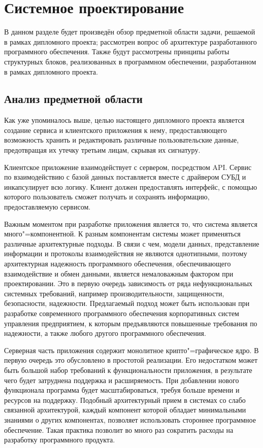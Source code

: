 \section{Системное проектирование}
\label{sec:domain}

В данном разделе будет произведён обзор предметной области задачи, решаемой в рамках дипломного проекта; рассмотрен вопрос об архитектуре разработанного программного обеспечения.
Также будут рассмотрены принципы работы структурных блоков, реализованных в программном обеспечении, разработанном в рамках дипломного проекта.

\subsection{Анализ предметной области}
\label{sub:domain:bayes_net}

Как уже упоминалось выше, целью настоящего дипломного проекта является создание сервиса и клиентского приложения к нему, предоставляющего возможность хранить и редактировать различные пользовательские данные, предотвращая их утечку третьим лицам, скрывая их сигнатуру.

Клиентское приложение взаимодействует с сервером, посредством API. Сервис по взаимодействию с базой данных поставляется вместе с драйвером СУБД и инкапсулирует всю логику. Клиент должен предоставлять интерфейс, с помощью которого пользователь сможет получать и сохранять информацию, предоставляемую сервисом.

Важным моментом при разработке приложения является то, что система является много"=компонентной. К разным компонентам системы может применяться различные архитектурные подходы. В связи с чем, модели данных, представление информации и протоколы взаимодействия не являются однотипными, поэтому архитектурная надежность программного обеспечения, обеспечивающего взаимодействие и обмен данными, является немаловажным фактором при проектировании. Это в первую очередь зависимость от ряда нефункциональных системных требований, например производительности, защищенности, безопасности, надежности.
Предлагаемый подход может быть использован при разработке современного программного обеспечения корпоративных систем управления предприятием, к которым предъявляются повышенные требования по надежности, а также любого другого программного обеспечения.

Серверная часть приложения содержит монолитное крипто"=графическое ядро. В первую очередь это обусловлено в простотой реализации. Его недостатком может быть большой набор требований к функциональности приложения, в результате чего будет затруднена поддержка и расширяемость. При добавлении нового функционала программа будет масштабироваться, требуя больше времени и ресурсов на поддержку.
Подобный архитектурный прием в системах со слабо связанной архитектурой, каждый компонент которой обладает минимальными знаниями о других компонентах, позволяет использовать стороннее программное обеспечение. Такая практика позволит во много раз сократить расходы на разработку программного продукта.

